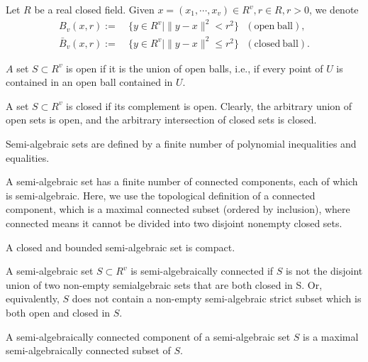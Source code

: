 \begin{definition}\label{def:real_field}
Let $R$ be a real closed field. 
Given $x= (x_{1}, \cdots, x_{v} ) \in R^{v}, r \in R, r>0$, we denote
\begin{align*}
B_{v}(x, r) := & ~ \{y \in R^{v} |\| y-x \|^{2}<r^{2} \}  \mathrm{~~~ (open~ball), } \\
\bar{B}_{v}(x, r) := & ~ \{y \in R^{v}| \| y - x \|^{2} \leq r^{2} \}  \mathrm{~~~ (closed~ball) }.
\end{align*}

$A$ set $S \subset R^{v}$ is open if it is the union of open balls, i.e., if every point of $U$ is contained in an open ball contained in $U$.

A set $S \subset R^{v}$ is closed if its complement is open. Clearly, the arbitrary union of open sets is open, and the arbitrary intersection of closed sets is closed.

Semi-algebraic sets are defined by a finite number of polynomial inequalities and equalities.

A semi-algebraic set has a finite number of connected components, each of which is semi-algebraic. Here, we use the topological definition of a connected component, which is a maximal connected subset (ordered by inclusion), where connected means it cannot be divided into two disjoint nonempty closed sets.

A closed and bounded semi-algebraic set is compact.

A semi-algebraic set $S \subset R^{v}$ is semi-algebraically connected if $S$ is not the disjoint union of two non-empty semialgebraic sets that are both closed in S. Or, equivalently, $S$ does not contain a non-empty semi-algebraic strict subset which is both open and closed in $S$. 

A semi-algebraically connected component of a semi-algebraic set $S$ is a maximal semi-algebraically connected subset of $S$. 
\end{definition}

